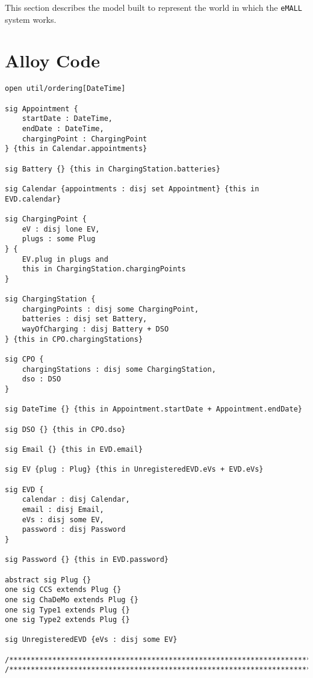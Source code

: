 This section describes the model built to represent the world in which the \verb|eMALL| system works.

\section{Alloy Code}
\label{sec:alloy}%
\begin{lstlisting}[language=alloy,label={lst:alloy_code}]
open util/ordering[DateTime]

sig Appointment {
	startDate : DateTime,
	endDate : DateTime,
	chargingPoint : ChargingPoint
} {this in Calendar.appointments}

sig Battery {} {this in ChargingStation.batteries}

sig Calendar {appointments : disj set Appointment} {this in EVD.calendar}

sig ChargingPoint {
	eV : disj lone EV,
	plugs : some Plug
} {
	EV.plug in plugs and
	this in ChargingStation.chargingPoints
}

sig ChargingStation {
	chargingPoints : disj some ChargingPoint,
	batteries : disj set Battery,
	wayOfCharging : disj Battery + DSO
} {this in CPO.chargingStations}

sig CPO {
	chargingStations : disj some ChargingStation,
	dso : DSO
}

sig DateTime {} {this in Appointment.startDate + Appointment.endDate}

sig DSO {} {this in CPO.dso}

sig Email {} {this in EVD.email}

sig EV {plug : Plug} {this in UnregisteredEVD.eVs + EVD.eVs}

sig EVD {
	calendar : disj Calendar,
	email : disj Email,
	eVs : disj some EV,
	password : disj Password
}

sig Password {} {this in EVD.password}

abstract sig Plug {}
one sig CCS extends Plug {}
one sig ChaDeMo extends Plug {}
one sig Type1 extends Plug {}
one sig Type2 extends Plug {}

sig UnregisteredEVD {eVs : disj some EV}

/************************************************************************************/
/************************************************************************************/


\end{lstlisting}
